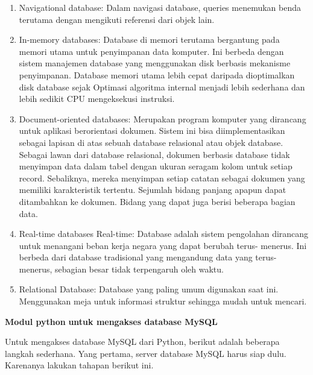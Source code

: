 \begin{enumerate}
\noindent 
\item Navigational database: Dalam navigasi database, queries menemukan benda terutama dengan mengikuti referensi dari objek lain. \par
\noindent 
\item In-memory databases: Database di memori terutama bergantung pada memori utama untuk penyimpanan data komputer. Ini berbeda dengan sistem manajemen database yang menggunakan disk berbasis mekanisme penyimpanan. Database memori utama lebih cepat daripada dioptimalkan disk database sejak Optimasi algoritma internal menjadi lebih sederhana dan lebih sedikit CPU mengeksekusi instruksi. \par
\noindent 
\item Document-oriented databases: Merupakan program komputer yang dirancang untuk aplikasi berorientasi dokumen. Sistem ini bisa diimplementasikan sebagai lapisan di atas sebuah database relasional atau objek database. Sebagai lawan dari database relasional, dokumen berbasis database tidak menyimpan data dalam tabel dengan ukuran seragam kolom untuk setiap record. Sebaliknya, mereka menyimpan setiap catatan sebagai dokumen yang memiliki karakteristik tertentu. Sejumlah bidang panjang apapun dapat ditambahkan ke dokumen. Bidang yang dapat juga berisi beberapa bagian data. \par
\noindent 
\item Real-time databases Real-time: Database adalah sistem pengolahan dirancang untuk menangani beban kerja negara yang dapat berubah terus- menerus. Ini berbeda dari database tradisional yang mengandung data yang terus- menerus, sebagian besar tidak terpengaruh oleh waktu. \par
\noindent 
\item Relational Database: Database yang paling umum digunakan saat ini. Menggunakan meja untuk informasi struktur sehingga mudah untuk mencari.\end{enumerate}
 \par
\vspace{12pt}
\noindent 
\textbf{Modul python}\textbf{ untuk mengakses database MySQL} \par
Untuk mengakses database MySQL dari Python, berikut adalah beberapa langkah sederhana. Yang pertama, server database MySQL harus siap dulu. Karenanya lakukan tahapan berikut ini. \par
\noindent 

